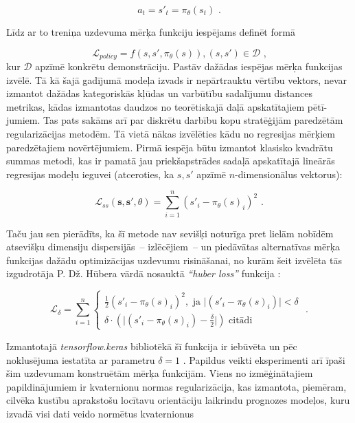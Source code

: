 \documentclass[12pt, a4paper]{article}
\numberwithin{equation}{section} %
\begin{document}
\begin{equation}
    a_t = s'_t = \pi_{\theta}(s_t)
\text{ .}
\end{equation}

Līdz ar to treniņa uzdevuma mērķa funkciju iespējams definēt formā

\begin{equation}
    \mathcal{L}_{policy} = f \left (s,s',\pi_{\theta}(s) \right ), (s,s') \in \mathcal{D}
\text{ ,}
\end{equation}
kur $\mathcal{D}$ apzīmē konkrētu demonstrāciju. Pastāv dažādas iespējas mērķa funkcijas izvēlē. Tā kā šajā gadījumā modeļa izvads ir nepārtrauktu vērtību vektors, nevar izmantot dažādas kategoriskās kļūdas un varbūtību sadalījumu distances metrikas, kādas izmantotas daudzos no teorētiskajā daļā apskatītajiem pētī-jumiem. Tas pats sakāms arī par diskrētu darbību kopu stratēģijām paredzētām regularizācijas metodēm. Tā vietā nākas izvēlēties kādu no regresijas mērķiem paredzētajiem novērtējumiem. Pirmā iespēja būtu izmantot klasisko kvadrātu summas metodi, kas ir pamatā jau priekšapstrādes sadaļā apskatītajā lineārās regresijas modeļu ieguvei (atceroties, ka $s, s'$ apzīmē $n$-dimensionālus vektorus):


\begin{equation}
    \mathcal{L}_{ss} ( \boldsymbol{s}, \boldsymbol{s'},\theta) = \sum_{i=1}^n (s'_i - \pi_{\theta}(s)_i)^2 
\text{ .}
\end{equation}

Taču jau sen pierādīts, ka šī metode nav sevišķi noturīga pret lielām nobīdēm atsevišķu dimensiju dispersijās~-- izlēcējiem~-- un piedāvātas alternatīvas mērķa funkcijas dažādu optimizācijas uzdevumu risināšanai, no kurām šeit izvēlēta tās izgudrotāja P. Dž. Hūbera vārdā nosauktā \textit{``huber loss''} funkcija \cite{huber_loss}:


\begin{equation}
    \mathcal{L}_{\delta} =  \sum_{i=1}^n 
    \begin{cases}
    \frac{1}{2} (s'_i - \pi_{\theta}(s)_i)^2, \text{ ja } \vert (s'_i - \pi_{\theta}(s)_i) \vert < \delta \\
    \delta \cdot \left (  \vert (s'_i - \pi_{\theta}(s)_i) - \frac{\delta}{2} \vert  \right ) \text{ citādi}
    \end{cases}
    \text{ .}
\end{equation}

Izmantotajā \textit{tensorflow.keras} bibliotēkā šī funkcija ir iebūvēta un pēc noklusējuma iestatīta ar parametru $\delta = 1$ \cite{keras_huber}. Papildus veikti eksperimenti arī īpaši šim uzdevumam konstruētām mērķa funkcijām. Viens no izmēģinātajiem papildinājumiem ir kvaternionu normas regularizācija, kas izmantota, piemēram, cilvēka kustību aprakstošu locītavu orientāciju laikrindu prognozes modeļos, kuru izvadā visi dati veido normētus kvaternionus \cite{pavllo2018quaternet}
\end{document}
